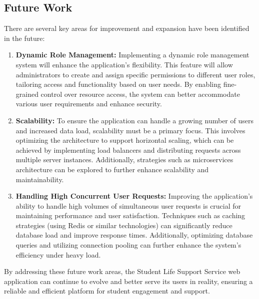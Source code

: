 \subsection{Future Work}
There are several key areas for improvement and expansion have been identified in the future:

	\begin{enumerate}
		\item \textbf{Dynamic Role Management:} Implementing a dynamic role management system will enhance the application’s flexibility. This feature will allow administrators to create and assign specific permissions to different user roles, tailoring access and functionality based on user needs. By enabling fine-grained control over resource access, the system can better accommodate various user requirements and enhance security.
		
		\item \textbf{Scalability:} To ensure the application can handle a growing number of users and increased data load, scalability must be a primary focus. This involves optimizing the architecture to support horizontal scaling, which can be achieved by implementing load balancers and distributing requests across multiple server instances. Additionally, strategies such as microservices architecture can be explored to further enhance scalability and maintainability.
		
		\item \textbf{Handling High Concurrent User Requests:} Improving the application’s ability to handle high volumes of simultaneous user requests is crucial for maintaining performance and user satisfaction. Techniques such as caching strategies (using Redis or similar technologies) can significantly reduce database load and improve response times. Additionally, optimizing database queries and utilizing connection pooling can further enhance the system's efficiency under heavy load.
	\end{enumerate}
	
\noindent By addressing these future work areas, the Student Life Support Service web application can continue to evolve and better serve its users in reality, ensuring a reliable and efficient platform for student engagement and support.

